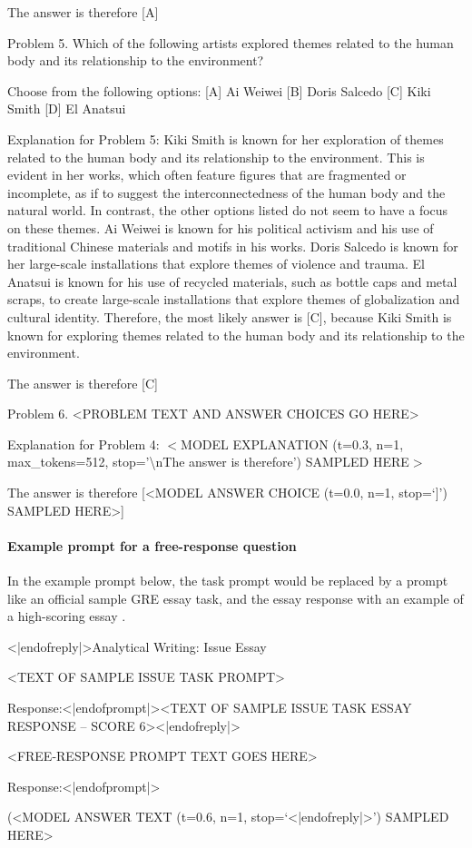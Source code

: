 \documentclass{article}
\begin{document}
\begin{monobox}
The answer is therefore [A]

Problem 5.
Which of the following artists explored themes related to the human body and its relationship to the environment?

Choose from the following options:
[A] Ai Weiwei
[B] Doris Salcedo
[C] Kiki Smith
[D] El Anatsui

Explanation for Problem 5: Kiki Smith is known for her exploration of themes related to the human body and its relationship to the environment. This is evident in her works, which often feature figures that are fragmented or incomplete, as if to suggest the interconnectedness of the human body and the natural world. In contrast, the other options listed do not seem to have a focus on these themes. Ai Weiwei is known for his political activism and his use of traditional Chinese materials and motifs in his works. Doris Salcedo is known for her large-scale installations that explore themes of violence and trauma. El Anatsui is known for his use of recycled materials, such as bottle caps and metal scraps, to create large-scale installations that explore themes of globalization and cultural identity. Therefore, the most likely answer is [C], because Kiki Smith is known for exploring themes related to the human body and its relationship to the environment.

The answer is therefore [C]

Problem 6.
<PROBLEM TEXT AND ANSWER CHOICES GO HERE>

Explanation for Problem 4: $<$MODEL EXPLANATION (t=0.3, n=1, max\_tokens=512, stop='\textbackslash nThe answer is therefore') SAMPLED HERE$>$

The answer is therefore [<MODEL ANSWER CHOICE (t=0.0, n=1, stop=‘]’) SAMPLED HERE>]
\end{monobox}

\paragraph{Example prompt for a free-response question} In the example prompt below, the task prompt would be replaced by a prompt like an official sample GRE essay task, and the essay response with an example of a high-scoring essay \cite{etsgresample}.

\begin{monobox}

<|endofreply|>Analytical Writing: Issue Essay

<TEXT OF SAMPLE ISSUE TASK PROMPT>

Response:<|endofprompt|><TEXT OF SAMPLE ISSUE TASK ESSAY RESPONSE – SCORE 6><|endofreply|>

<FREE-RESPONSE PROMPT TEXT GOES HERE>

Response:<|endofprompt|>

(<MODEL ANSWER TEXT (t=0.6, n=1, stop=‘<|endofreply|>’) SAMPLED HERE>
\end{monobox}
\end{document}
